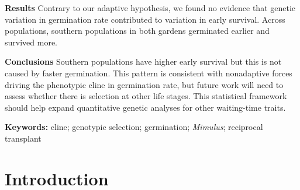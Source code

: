 \documentclass[
  12pt,
]{article}
\begin{document}
\textbf{Results} Contrary to our adaptive hypothesis, we found no evidence that genetic variation in germination rate contributed to variation in early survival. Across populations, southern populations in both gardens germinated earlier and survived more.

\textbf{Conclusions} Southern populations have higher early survival but this is not caused by faster germination. This pattern is consistent with nonadaptive forces driving the phenotypic cline in germination rate, but future work will need to assess whether there is selection at other life stages. This statistical framework should help expand quantitative genetic analyses for other waiting-time traits.

\textbf{Keywords:} cline; genotypic selection; germination; \emph{Mimulus}; reciprocal transplant

\newpage

\hypertarget{introduction}{%
\section{Introduction}\label{introduction}}
\end{document}
